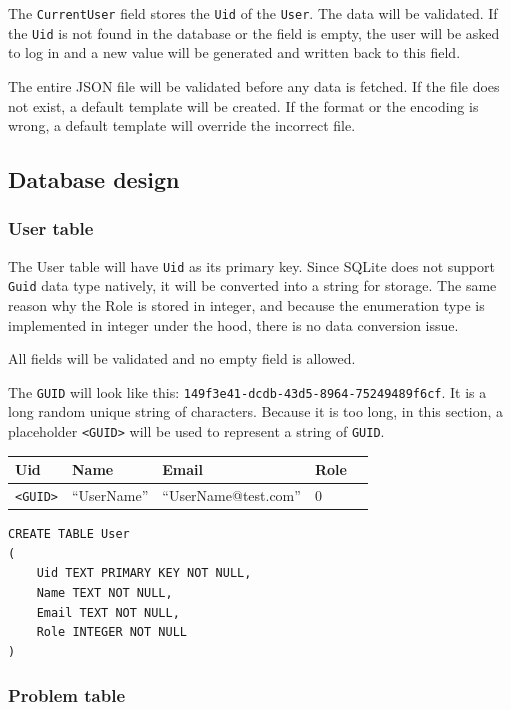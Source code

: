 \documentclass[a4paper]{report}
\newcommand{\code}{\texttt}
\begin{document}
The \code{CurrentUser} field stores the \code{Uid} of the \code{User}. The data will be validated. If the \code{Uid} is not found in the database or the field is empty, the user will be asked to log in and a new value will be generated and written back to this field.

The entire JSON file will be validated before any data is fetched. If the file does not exist, a default template will be created. If the format or the encoding is wrong, a default template will override the incorrect file.

\subsection{Database design}
\label{subsec:database design}

\subsubsection{User table}

The User table will have \code{Uid} as its primary key. Since SQLite does not support \code{Guid} data type natively, it will be converted into a string for storage. The same reason why the Role is stored in integer, and because the enumeration type is implemented in integer under the hood, there is no data conversion issue.

All fields will be validated and no empty field is allowed.

The \code{GUID} will look like this: \code{149f3e41-dcdb-43d5-8964-75249489f6cf}. It is a long random unique string of characters. Because it is too long, in this section, a placeholder \code{<GUID>} will be used to represent a string of \code{GUID}.

\begin{tabulary}{\textwidth}{|L|L|L|L|L|}
    \hline
    Uid & Name & Email & Role \\
    \hline
    \code{<GUID>} & ``UserName'' & ``UserName@test.com'' & 0 \\
    \hline
\end{tabulary}

\begin{verbatim}
CREATE TABLE User
(
    Uid TEXT PRIMARY KEY NOT NULL,
    Name TEXT NOT NULL,
    Email TEXT NOT NULL,
    Role INTEGER NOT NULL
)
\end{verbatim}

\subsubsection{Problem table}
\end{document}
